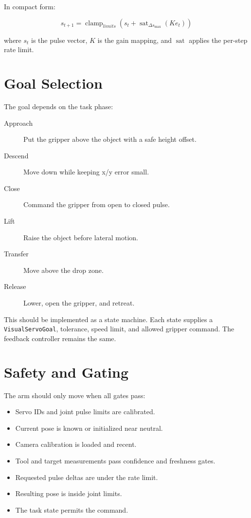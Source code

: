 \documentclass[11pt]{article}
\begin{document}
In compact form:

\[
    s_{t+1} =
    \operatorname{clamp}_{limits}
    \left(
        s_t +
        \operatorname{sat}_{\Delta s_{\max}}(K e_t)
    \right)
\]

where $s_t$ is the pulse vector, $K$ is the gain mapping, and
$\operatorname{sat}$ applies the per-step rate limit.

\section{Goal Selection}

The goal depends on the task phase:

\begin{description}
    \item[Approach] Put the gripper above the object with a safe height offset.
    \item[Descend] Move down while keeping x/y error small.
    \item[Close] Command the gripper from open to closed pulse.
    \item[Lift] Raise the object before lateral motion.
    \item[Transfer] Move above the drop zone.
    \item[Release] Lower, open the gripper, and retreat.
\end{description}

This should be implemented as a state machine. Each state supplies a
\texttt{VisualServoGoal}, tolerance, speed limit, and allowed gripper command.
The feedback controller remains the same.

\section{Safety and Gating}

The arm should only move when all gates pass:

\begin{itemize}[leftmargin=*]
    \item Servo IDs and joint pulse limits are calibrated.
    \item Current pose is known or initialized near neutral.
    \item Camera calibration is loaded and recent.
    \item Tool and target measurements pass confidence and freshness gates.
    \item Requested pulse deltas are under the rate limit.
    \item Resulting pose is inside joint limits.
    \item The task state permits the command.
\end{itemize}
\end{document}
